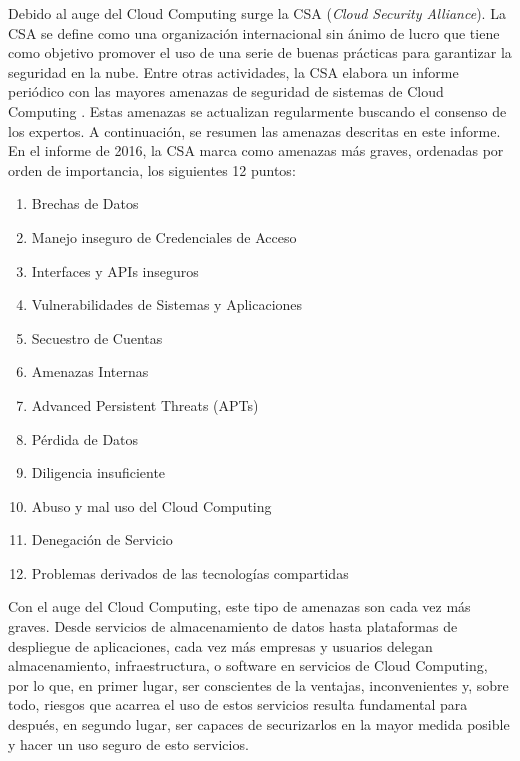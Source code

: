 Debido al auge del Cloud Computing surge la CSA (\textit{Cloud Security Alliance}). La CSA se define como una organización internacional sin ánimo de lucro que tiene como objetivo promover el uso de una serie de buenas prácticas para garantizar la seguridad en la nube.
Entre otras actividades, la CSA elabora un informe periódico con las mayores amenazas de seguridad de sistemas de Cloud Computing \cite{csa-cloud-12-threats}. Estas amenazas se actualizan regularmente buscando el consenso de los expertos. A continuación, se resumen las amenazas descritas en este informe. En el informe de 2016, la CSA marca como amenazas más graves, ordenadas por orden de importancia, los siguientes 12 puntos:
\begin{enumerate}
	\item Brechas de Datos
	\item Manejo inseguro de Credenciales de Acceso
	\item Interfaces y APIs inseguros
	\item Vulnerabilidades de Sistemas y Aplicaciones
	\item Secuestro de Cuentas
	\item Amenazas Internas
	\item Advanced Persistent Threats (APTs)
	\item Pérdida de Datos
	\item Diligencia insuficiente
	\item Abuso y mal uso del Cloud Computing
	\item Denegación de Servicio
	\item Problemas derivados de las tecnologías compartidas
\end{enumerate}

Con el auge del Cloud Computing, este tipo de amenazas son cada vez más graves. Desde servicios de almacenamiento de datos hasta plataformas de despliegue de aplicaciones, cada vez más empresas y usuarios delegan almacenamiento, infraestructura, o software en servicios de Cloud Computing, por lo que, en primer lugar, ser conscientes de la ventajas, inconvenientes y, sobre todo, riesgos que acarrea el uso de estos servicios resulta fundamental para después, en segundo lugar, ser capaces de securizarlos en la mayor medida posible y hacer un uso seguro de esto servicios.